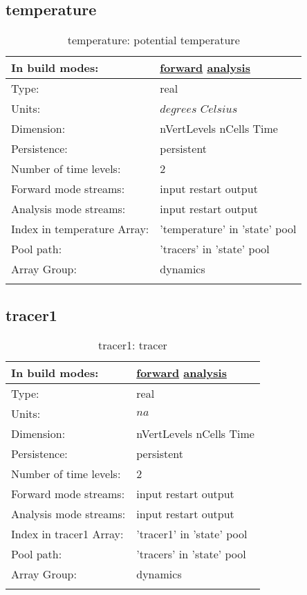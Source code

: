 \subsection[temperature]{temperature}
\label{subsec:var_sec_state_temperature}
\begin{center}
\begin{longtable}{| p{2.0in} | p{4.0in} |}
        \hline 
        In build modes: & \hyperref[subsec:forward_var_tab_state]{forward} \hyperref[subsec:analysis_var_tab_state]{analysis} \\
        \hline 
        Type: & real \\
        \hline 
        Units: & $degrees$ $Celsius$ \\
        \hline 
        Dimension: & nVertLevels nCells Time \\
        \hline 
        Persistence: & persistent \\
        \hline 
        Number of time levels: & 2 \\
        \hline 
		 Forward mode streams: &  input restart output \\
        \hline 
		 Analysis mode streams: &  input restart output \\
        \hline 
		 Index in temperature Array: & 'temperature' in 'state' pool \\
		 \hline 
            Pool path: & 'tracers' in 'state' pool
 \\
		 \hline 
		 Array Group: & dynamics \\
		 \hline 
    \caption{temperature: potential temperature}
\end{longtable}
\end{center}
\subsection[tracer1]{tracer1}
\label{subsec:var_sec_state_tracer1}
\begin{center}
\begin{longtable}{| p{2.0in} | p{4.0in} |}
        \hline 
        In build modes: & \hyperref[subsec:forward_var_tab_state]{forward} \hyperref[subsec:analysis_var_tab_state]{analysis} \\
        \hline 
        Type: & real \\
        \hline 
        Units: & $na$ \\
        \hline 
        Dimension: & nVertLevels nCells Time \\
        \hline 
        Persistence: & persistent \\
        \hline 
        Number of time levels: & 2 \\
        \hline 
		 Forward mode streams: &  input restart output \\
        \hline 
		 Analysis mode streams: &  input restart output \\
        \hline 
		 Index in tracer1 Array: & 'tracer1' in 'state' pool \\
		 \hline 
            Pool path: & 'tracers' in 'state' pool
 \\
		 \hline 
		 Array Group: & dynamics \\
		 \hline 
    \caption{tracer1: tracer}
\end{longtable}
\end{center}
